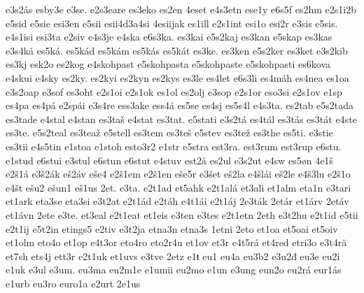 {    e3s2ás
    esby3e
    e3se.
    e2s3eare
    es3eko
    es2en
    4eset
    e4s3etn
    ese1y
    e6s5f
    es2hm
    e2s1i2b
    e5sid
    e5sie
    esi3en
    e5sii
    esii4d3a4si
    4esiijak
    es1ill
    e2s1int
    esi1o
    esi2r
    e3sis
    e5sis.
    e4s1isi
    esi3ta
    e2siv
    e4s3je
    e4ska
    e6s3ka.
    es3kai
    e5s2kaj
    es3kan
    e5skap
    es3kas
    e3s4ká
    es5ká.
    es5kád
    es5kám
    es5kás
    es5kát
    es3ke.
    es3ken
    e5s2ker
    es3ket
    e3s2kib
    es3kj
    esk2o
    es2kog
    e4skohpast
    e5skohpasta
    e5skohpaste
    e5skohpasti
    es6kova
    e4skui
    e4sky
    es2ky.
    es2kyi
    es2kyn
    es2kys
    es3le
    es4let
    e6s3li
    es4máh
    es4nea
    es1oa
    e3s2oap
    e3sof
    es3oht
    e2s1oi
    e2s1ok
    es1ol
    es2olj
    e3sop
    e2s1or
    eso3si
    e2s1ov
    e1sp
    es4pa
    es4pá
    e2spái
    e3s4re
    ess3ake
    ess4á
    es5se
    es4sj
    es5s4l
    e4s3ta.
    es2tab
    e5s2tada
    es3tade
    e4stal
    e4stan
    es3taš
    e4stat
    es3tat.
    e5stati
    e3s2tá
    es4tál
    es3tás
    es3tát
    e4ste
    es3te.
    e5s2teal
    es3teaž
    e5stell
    es3tem
    es3teš
    e5stev
    es3tež
    es3the
    es5ti.
    e3stie
    es3tii
    e4s5tin
    e1stoa
    e1stoh
    esto3r2
    e1str
    e5stra
    est3ra.
    est3rum
    est3rup
    e6stu.
    e1stud
    e6stui
    e3stul
    e6stun
    e6stut
    e4stuv
    est2å
    es2ul
    e3s2ut
    e4sw
    es5øn
    4e1š
    e2š1á
    e3š2ák
    eš2áv
    eše4
    e2š1em
    e2š1en
    eše5r
    e3šet
    eš2la
    e4šlái
    eš2le
    e4š3lu
    e2š1o
    e4št
    ešu2
    ešun1
    eš1us
    2et.
    e3ta.
    e2t1ad
    et5ahk
    e2t1alá
    et3ali
    et1alm
    eta1n
    e3tari
    et1ark
    eta3se
    eta3si
    e3t2at
    e2t1ád
    e2táh
    e4t1ái
    e2t1áj
    2e3ták
    2etár
    et1árv
    2etáv
    et1ávn
    2ete
    e3te.
    et3eal
    e2t1eat
    et1eis
    e3ten
    e3tes
    e2t1etn
    2eth
    e3t2hu
    e2t1id
    e5tii
    e2t1ij
    e5t2in
    etings5
    e2tiv
    e3t2ja
    etna3n
    etna3s
    1etni
    2eto
    et1oa
    et5oai
    et5oiv
    et1olm
    eto4o
    et1op
    e4t3or
    eto4ro
    eto2r4u
    et1ov
    et3r
    e4t5rá
    et4red
    etri3o
    e3t4rä
    et7sh
    ets4j
    ett3r
    e2t1uk
    et1uvs
    e3tve
    2etz
    e1ŧ
    eu1
    eu4a
    eu3b2
    e3u2đ
    eu3e
    eu2i
    e1uk
    e3ul
    e3um.
    eu3ma
    eu2m1e
    e1umii
    eu2mo
    e1un
    e3ung
    eun2o
    eu2rá
    eur1ás
    e1urb
    eu3ro
    euro1a
    e2urt
    2e1us
}

